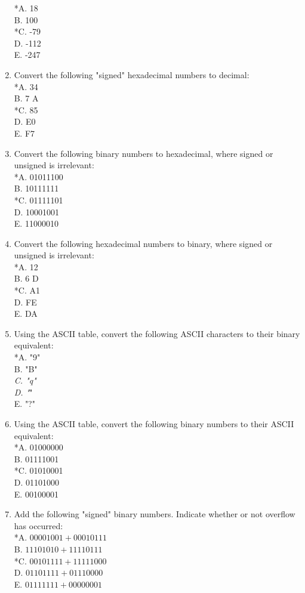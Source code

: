 \documentclass[10pt]{article}
\begin{document}
\begin{enumerate}
*A. 18\\
B. 100\\
*C. -79\\
D. -112\\
E. -247
  \item Convert the following "signed" hexadecimal numbers to decimal:\\
*A. 34\\
B. 7 A\\
*C. 85\\
D. E0\\
E. F7
  \item Convert the following binary numbers to hexadecimal, where signed or unsigned is irrelevant:\\
*A. 01011100\\
B. 10111111\\
*C. 01111101\\
D. 10001001\\
E. 11000010
  \item Convert the following hexadecimal numbers to binary, where signed or unsigned is irrelevant:\\
*A. 12\\
B. 6 D\\
*C. A1\\
D. FE\\
E. DA
  \item Using the ASCII table, convert the following ASCII characters to their binary equivalent:\\
*A. "9"\\
B. "B"\\
\textit{C. "q"\\
D. "}"\\
E. "?"
  \item Using the ASCII table, convert the following binary numbers to their ASCII equivalent:\\
*A. 01000000\\
B. 01111001\\
*C. 01010001\\
D. 01101000\\
E. 00100001
  \item Add the following "signed" binary numbers. Indicate whether or not overflow has occurred:\\
*A. $00001001+00010111$\\
B. $11101010+11110111$\\
*C. $00101111+11111000$\\
D. $01101111+01110000$\\
E. $01111111+00000001$

\end{enumerate}
\end{document}
